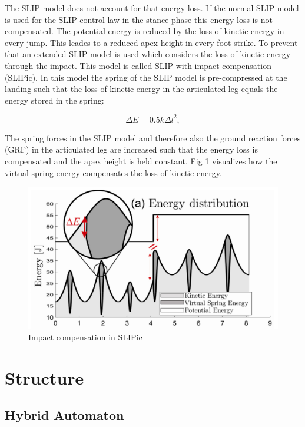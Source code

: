 \documentclass[journal,onecolumn]{IEEEtran}
\begin{document}
	The SLIP model does not account for that energy loss. If the normal SLIP model is used for the SLIP 
	control law in the stance phase this energy loss is not compensated. The potential energy is reduced by the loss of kinetic energy in every jump. This leades to a reduced apex height 
	in every foot strike. To prevent that an extended SLIP model is used which considers the loss of kinetic energy through the impact. This model is called SLIP with impact compensation 
	(SLIPic). In this model the spring of the SLIP model is pre-compressed at the landing such that the loss of kinetic energy in the articulated leg equals the energy stored in the spring: 
	
	\begin{equation}
	\Delta E = 0.5 k {\Delta l}^{2},
	\end{equation}
	
	The spring forces in the SLIP model and therefore also the ground reaction forces (GRF) in the articulated leg are increased such that the energy loss is compensated and the apex height is 
	held constant. Fig \ref{fig:SLIPic} visualizes how the virtual spring energy compensates the loss of kinetic energy.
	
	\begin{figure}[h]
		\centering
		\includegraphics[scale=0.15]{"assets/SLIPic.png"}
		\caption{Impact compensation in SLIPic \cite{Hutter2010}}
		\label{fig:SLIPic}
	\end{figure}
	
	\section{Structure}
	\label{sec:Structure}
	\subsection{Hybrid Automaton}
	
\end{document}
